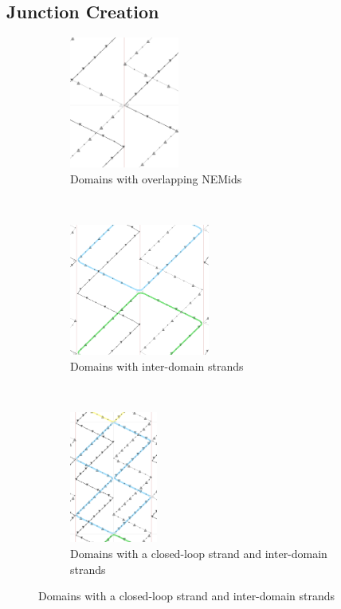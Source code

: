 \documentclass[titlepage]{article}
\begin{document}
\subsection{Junction Creation} \label{sect:quickstart-junction-creation}
\begin{figure}[h] \label{fig:creating-junctions}
	\centering
	\caption{Creating cross-strand junctions}
	
	\begin{subfigure}{.3\textwidth}
		\centering
		\includegraphics[height=1.7in]{creating-junctions-1.png}
		\caption{Domains with overlapping NEMids}
	\end{subfigure}%
	~
	\begin{subfigure}{.3\textwidth}
		\centering
		\includegraphics[height=1.7in]{creating-junctions-2.png}
		\caption{Domains with inter-domain strands}
	\end{subfigure}%
	~
	\begin{subfigure}{.3\textwidth}
		\centering
		\includegraphics[height=1.7in]{creating-junctions-3.png}
		\caption{Domains with a closed-loop strand and inter-domain strands}
	\end{subfigure}
\end{figure}
\end{document}
